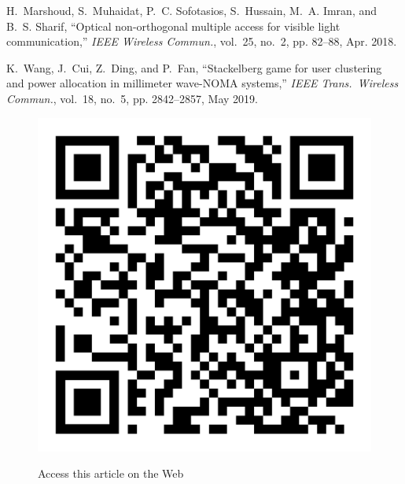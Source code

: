 \begin{multicols}{2}
\begin{thebibliography}{99}
H.~{Marshoud}, S.~{Muhaidat}, P.~C. {Sofotasios}, S.~{Hussain}, M.~A. {Imran},
  and B.~S. {Sharif}, ``Optical non-orthogonal multiple access for visible
  light communication,'' \emph{{IEEE} Wireless Commun.}, vol.~25, no.~2, pp.
  82--88, Apr. 2018.

K.~{Wang}, J.~{Cui}, Z.~{Ding}, and P.~{Fan}, ``Stackelberg game for user
  clustering and power allocation in millimeter wave-{NOMA} systems,''
  \emph{IEEE Trans.\ Wireless Commun.}, vol.~18, no.~5, pp. 2842--2857, May
  2019.
\end{thebibliography}
\end{multicols}

\vskip 1cm

\begin{figure}[H]
\centering
\includegraphics[scale=.15]{src/Figures/QR-codes/qr-code_non-orthogonal.png}

\medskip

{\large\sf Access this article on the Web}
\end{figure}
